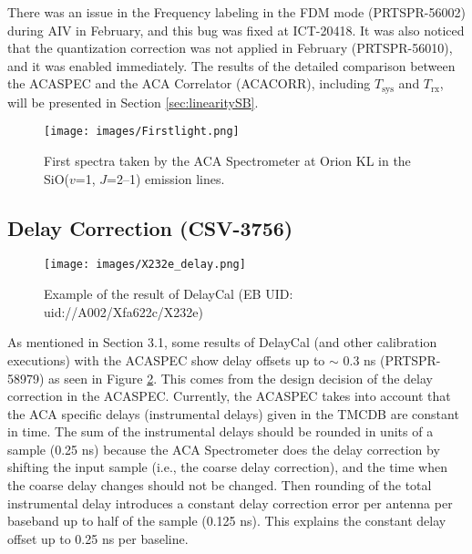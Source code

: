 There was an issue in the Frequency labeling in the FDM mode (PRTSPR-56002) during AIV in February, and this bug was fixed at ICT-20418. It was also noticed that the quantization correction was not applied in February (PRTSPR-56010), and it was enabled immediately. The results of the detailed comparison between the ACASPEC and the ACA Correlator (ACACORR), including $T_{\mathrm{sys}}$ and $T_{\mathrm{rx}}$, will be presented in Section \ref{sec:linearitySB}.

\begin{figure}[htbp]
     \centering
     \texttt{[image: images/Firstlight.png]}
     \caption{First spectra taken by the ACA Spectrometer at Orion KL in the SiO($v$=1, $J$=2--1) emission lines.}
     \label{fig:Firstlight}
\end{figure}





\newpage
\subsection{Delay Correction  (CSV-3756)}\label{sec:delaycorrection}

\begin{figure}[htbp]
     \centering
     \texttt{[image: images/X232e\_delay.png]}
     \caption{Example of the result of DelayCal (EB UID: uid://A002/Xfa622c/X232e)}
     \label{fig:DelayResidual}
\end{figure}

As mentioned in Section 3.1, some results of DelayCal (and other calibration executions) with the ACASPEC show delay offsets up to $\sim$ 0.3 ns (PRTSPR-58979) as seen in Figure \ref{fig:DelayResidual}. This comes from the design decision of the delay correction in the ACASPEC. Currently, the ACASPEC takes into account that the ACA specific delays (instrumental delays) given in the TMCDB are constant in time. The sum of the instrumental delays should be rounded in units of a sample (0.25 ns) because the ACA Spectrometer does the delay correction by shifting the input sample (i.e., the coarse delay correction), and the time when the coarse delay changes should not be changed. Then rounding of the total instrumental delay introduces a constant delay correction error per antenna per baseband up to half of the sample (0.125 ns). This explains the constant delay offset up to 0.25 ns per baseline.

